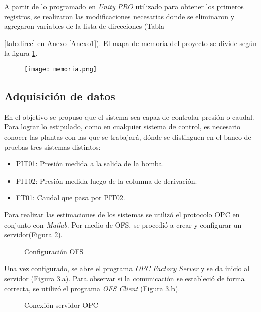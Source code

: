 
A partir de lo programado en \textit{Unity PRO} utilizado para obtener los primeros registros, se realizaron las modificaciones necesarias donde se eliminaron y agregaron variables de la lista de direcciones (Tabla {\ref{tab:direc} en Anexo \ref{Anexo1}). El mapa de memoria del proyecto se divide según la figura \ref{fig:memoria}.
	
\begin{figure}[h!]
	\centering
	\texttt{[image: memoria.png]}
	\label{fig:memoria}
\end{figure}


\subsection{Adquisición de datos}
En el objetivo se propuso que el sistema sea capaz de controlar presión o caudal. Para lograr lo estipulado, como en cualquier sistema de control, es necesario conocer las plantas con las que se trabajará, dónde se distinguen en el banco de pruebas tres sistemas distintos:
\begin{itemize}
	\item PIT01: Presión medida a la salida de la bomba.
	\item PIT02: Presión medida luego de la columna de derivación.
	\item FT01: Caudal que pasa por PIT02.
\end{itemize}

Para realizar las estimaciones de los sistemas se utilizó el protocolo OPC en conjunto con \textit{Matlab}. Por medio de OFS, se procedió a crear y configurar un servidor(Figura \ref{fig:opc1}).

\begin{figure}[h!]
	\centering
	\caption{Configuración OFS} \label{fig:opc1}
\end{figure}


Una vez configurado, se abre el programa \textit{OPC Factory Server} y se da inicio al servidor (Figura \ref{fig:opc2}.a). Para observar si la comunicación se estableció de forma correcta, se utilizó el programa \textit{OFS Client} (Figura \ref{fig:opc2}.b).

\begin{figure}[h!]
	\centering
	\caption{Conexión servidor OPC} \label{fig:opc2}
\end{figure}

}
